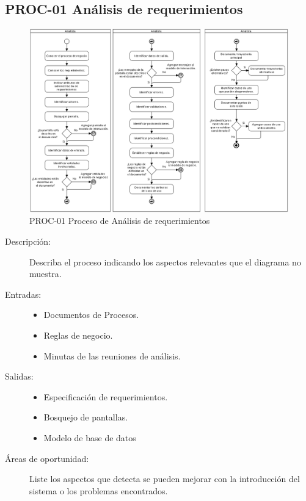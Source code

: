 \subsection{PROC-01 Análisis de requerimientos}

\begin{figure}[htbp]
	\begin{center}
		\includegraphics[width=.7\textwidth]{images/proceso1}
		\caption{PROC-01 Proceso de Análisis de requerimientos}
		\label{fig:proceso1}
	\end{center}
\end{figure}

\begin{description}
	\item[Descripción:] Describa el proceso indicando los aspectos relevantes que el diagrama no muestra.
	\item[Entradas:] \cdtEmpty
        \begin{itemize}
			\item Documentos de Procesos.
			\item Reglas de negocio.
			\item Minutas de las reuniones de análisis.
        \end{itemize}
	\item[Salidas:] \cdtEmpty
        \begin{itemize}
			\item Especificación de requerimientos.
			\item Bosquejo de pantallas.
			\item Modelo de base de datos
        \end{itemize}	
    \item[Áreas de oportunidad:] Liste los aspectos que detecta se pueden mejorar con la introducción del sistema o los problemas encontrados.
\end{description}
